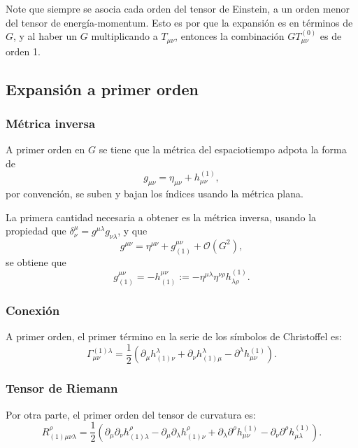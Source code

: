 Note que siempre se asocia cada orden del tensor de Einstein, a un orden menor del tensor de energía-momentum. Esto es por que la expansión es en términos de $G$, y al haber un $G$ multiplicando a $T_{\mu \nu}$, entonces la combinación $GT_{\mu \nu}^{(0)}$ es de orden 1.

\subsection{Expansión a primer orden}
\subsubsection{Métrica inversa}

A primer orden en $G$ se tiene que la métrica del espaciotiempo adpota la forma de
\begin{equation}
g_{\mu \nu} = \eta_{\mu \nu} + h_{\mu \nu}^{(1)},
\end{equation}
por convención, se suben y bajan los índices usando la métrica plana.

La primera cantidad necesaria a obtener es la métrica inversa, usando la propiedad que $\delta^{\mu}_{\nu} = g^{\mu \lambda} g_{\nu \lambda}$, y que
\begin{equation}
g^{\mu \nu} = \eta^{\mu \nu} + g^{\mu \nu}_{(1)} + \mathcal{O}(G^2),
\end{equation}
se obtiene que 
\begin{equation}
g^{\mu \nu}_{(1)} = -h^{\mu \nu}_{(1)} := -\eta^{\mu \lambda} \eta^{\nu \rho} h_{\lambda \rho}^{(1)}.
\end{equation}

\subsubsection{Conexión}
A primer orden, el primer término en la serie de los símbolos de Christoffel es:
\begin{equation}
\Gamma^{(1)\lambda}_{\mu \nu} = \frac{1}{2} \left( \partial_{\mu} h^{\lambda}_{(1) \nu} + \partial_{\nu} h^{\lambda}_{(1) \mu} - \partial^{\lambda} h_{\mu \nu}^{(1)} \right).
\end{equation}

\subsubsection{Tensor de Riemann}
Por otra parte, el primer orden del tensor de curvatura es:
\begin{equation}
\label{eq:85}
R^{\rho}_{(1) \mu \nu \lambda} = \frac{1}{2} \left( \partial_{\mu} \partial_{\nu} h^{\rho}_{(1) \lambda} - \partial_{\mu} \partial_{\lambda} h^{\rho}_{(1) \nu} + \partial_{\lambda} \partial^{\rho} h_{\mu \nu}^{(1)} - \partial_{\nu} \partial^{\rho} h_{\mu \lambda}^{(1)} \right).
\end{equation}

